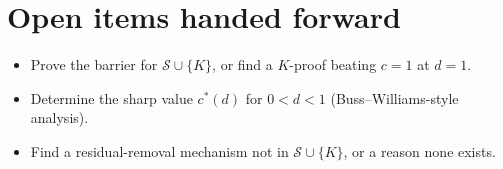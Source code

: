 \documentclass[11pt]{article}
\theoremstyle{definition}
\theoremstyle{remark}
\begin{document}
\section{Open items handed forward}
\begin{itemize}
\item Prove the barrier for $\mathcal S\cup\{K\}$, or find a $K$-proof beating $c=1$ at $d=1$.
\item Determine the sharp value $c^*(d)$ for $0<d<1$ (Buss--Williams-style analysis).
\item Find a residual-removal mechanism not in $\mathcal S\cup\{K\}$, or a reason none exists.
\end{itemize}
\end{document}
